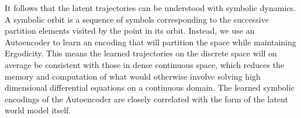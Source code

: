 \documentclass{article}
\begin{document}
It follows that the latent trajectories can be understood with symbolic dynamics. A symbolic orbit is a sequence of symbols corresponding to the successive partition elements visited by the point in its orbit. Instead, we use an Autoencoder to learn an encoding that will partition the space while maintaining Ergodicity. This means the learned trajectories on the discrete space will on average be consistent with those in dense continuous space, which reduces the memory and computation of what would otherwise involve solving high dimensional differential equations on a continuous domain. The learned symbolic encodings of the Autoencoder are closely correlated with the form of the latent world model itself.




\end{document}
